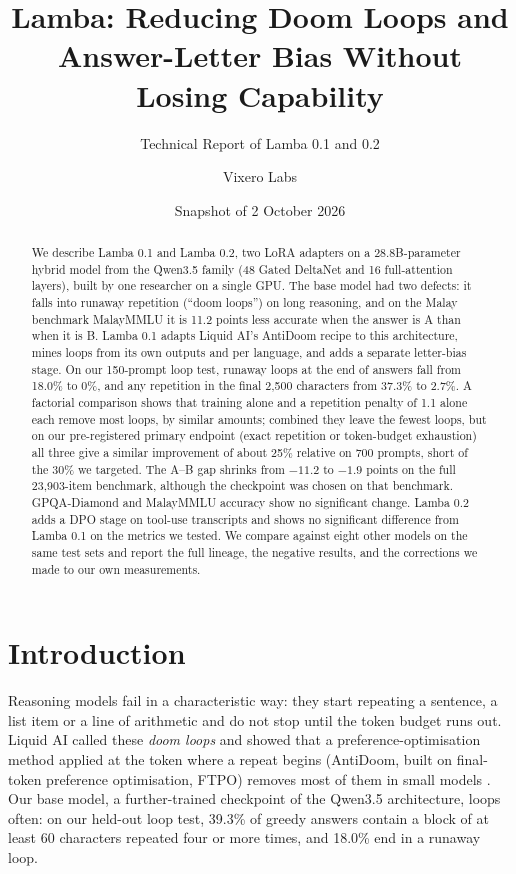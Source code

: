 \documentclass[11pt]{article}
\title{Lamba: Reducing Doom Loops and Answer-Letter Bias Without Losing Capability}
\subtitle{Technical Report of Lamba 0.1 and 0.2}
\author{Vixero Labs}
\date{Snapshot of 2 October 2026}
\begin{document}
\maketitle

\begin{abstract}
We describe Lamba 0.1 and Lamba 0.2, two LoRA adapters on a 28.8B-parameter hybrid model from the Qwen3.5 family (48 Gated DeltaNet and 16 full-attention layers), built by one researcher on a single GPU. The base model had two defects: it falls into runaway repetition (``doom loops'') on long reasoning, and on the Malay benchmark MalayMMLU it is 11.2 points less accurate when the answer is A than when it is B. Lamba 0.1 adapts Liquid AI's AntiDoom recipe to this architecture, mines loops from its own outputs and per language, and adds a separate letter-bias stage. On our 150-prompt loop test, runaway loops at the end of answers fall from 18.0\% to 0\%, and any repetition in the final 2,500 characters from 37.3\% to 2.7\%. A factorial comparison shows that training alone and a repetition penalty of 1.1 alone each remove most loops, by similar amounts; combined they leave the fewest loops, but on our pre-registered primary endpoint (exact repetition or token-budget exhaustion) all three give a similar improvement of about 25\% relative on 700 prompts, short of the 30\% we targeted. The A--B gap shrinks from $-11.2$ to $-1.9$ points on the full 23,903-item benchmark, although the checkpoint was chosen on that benchmark. GPQA-Diamond and MalayMMLU accuracy show no significant change. Lamba 0.2 adds a DPO stage on tool-use transcripts and shows no significant difference from Lamba 0.1 on the metrics we tested. We compare against eight other models on the same test sets and report the full lineage, the negative results, and the corrections we made to our own measurements.
\end{abstract}

\setcounter{tocdepth}{1}
\tableofcontents
\newpage

\section{Introduction}

Reasoning models fail in a characteristic way: they start repeating a sentence, a list item or a line of arithmetic and do not stop until the token budget runs out. Liquid AI called these \emph{doom loops} and showed that a preference-optimisation method applied at the token where a repeat begins (AntiDoom, built on final-token preference optimisation, FTPO) removes most of them in small models \citep{liquid2025antidoom}. Our base model, a further-trained checkpoint of the Qwen3.5 architecture, loops often: on our held-out loop test, 39.3\% of greedy answers contain a block of at least 60 characters repeated four or more times, and 18.0\% end in a runaway loop.
\end{document}
